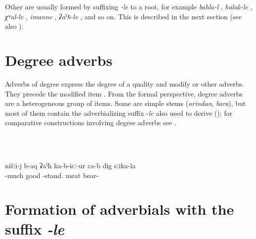 Other  are usually formed by suffixing \textit{-le} to a root, for example \textit{bahla-l} , \textit{halak-le} , \textit{χʷal-le} , \textit{imanne} , \textit{ʡaˁħ-le} , and so on. This is described in the next section (see also ).



\section{Degree adverbs}
\label{sec:Degree adverbs}

Adverbs of degree express the degree of a quality and modify  or other adverbs. They precede the modified item . From the formal perspective, degree adverbs are a heterogeneous group of items. Some are simple stems (\textit{arindan}, \textit{bara}), but most of them contain the adverbializing suffix -\textit{le} also used to derive   (); for comparative constructions involving degree adverbs see . 

\begin{exe}
	\ex	\label{ex:listDegreeAdverbs}
	\TabPositions{14em}
		  \tab {}  \\
		  \tab {}  \\
          \tab {} 

		\ex	\label{ex:‎‎We liked the meat of the bear very much}
	\gll	nišːi-j	b-aq	ʡaˁħ	ka-b-icː-ur ca-b	dig	sːika-la	\\
		 	-much	good	-stand. 	meat	bear- \\
	\glt	{}
	\end{exe}
	

\section{Formation of adverbials with the suffix \textit{-le}}
\label{sec:FormationOfAdverbialsWithTheSuffixLe}


